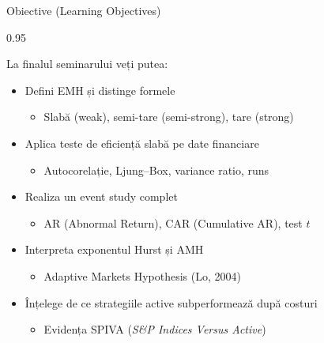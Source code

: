 \documentclass[9pt, aspectratio=169, t]{beamer}
\begin{document}
\begin{frame}[shrink=15]{Obiective (Learning Objectives)}
\begin{cminipage}{0.95\textwidth}
\begin{block}{La finalul seminarului veți putea:}
\begin{itemize}\setlength{\itemsep}{0pt}
    \item Defini EMH și distinge formele
    \begin{itemize}\setlength{\itemsep}{0pt}
        \item Slabă (weak), semi-tare (semi-strong), tare (strong)
    \end{itemize}
    \item Aplica teste de eficiență slabă pe date financiare
    \begin{itemize}\setlength{\itemsep}{0pt}
        \item Autocorelație, Ljung--Box, variance ratio, runs
    \end{itemize}
    \item Realiza un event study complet
    \begin{itemize}\setlength{\itemsep}{0pt}
        \item AR (Abnormal Return), CAR (Cumulative AR), test $t$
    \end{itemize}
    \item Interpreta exponentul Hurst și AMH
    \begin{itemize}\setlength{\itemsep}{0pt}
        \item Adaptive Markets Hypothesis (Lo, 2004)
    \end{itemize}
    \item Înțelege de ce strategiile active subperformează după costuri
    \begin{itemize}\setlength{\itemsep}{0pt}
        \item Evidența SPIVA (\textit{S\&P Indices Versus Active})
    \end{itemize}
\end{itemize}
\end{block}
\end{cminipage}
\end{frame}

\end{document}
